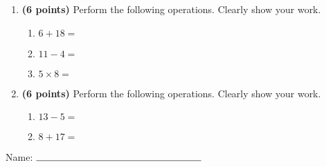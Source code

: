 \documentclass[12pt]{amsart}
\begin{document}
\newpage
\begin{enumerate}
\item {\bf (6 points)} 
 Perform the following operations. Clearly show your work. \begin{enumerate}


\def \a{6}\def \b{18}\def \apb{24}

 
\item $\a + \b = $

\vspace{2cm}
\def \a{11}\def \dif{7}\def \b{4}

 
\item $\a - \b = $

\vspace{2cm}
\def \a{5}\def \b{8}\def \ab{13}

 
\item $\a \times \b = $ 

\vspace{2cm}
\def \vshift{-1}\def \hshift{4}\def \chang{2}\def \findval{6}\def \yval{-5}

 
\end{enumerate}


\newpage
\item {\bf (6 points)} 
 Perform the following operations. Clearly show your work. \begin{enumerate}


\def \a{13}\def \dif{8}\def \b{5}

 
\item $\a - \b = $

\vspace{2cm}
\def \a{8}\def \b{17}\def \apb{25}

 
\item $\a + \b = $

\vspace{2cm}
\def \vshift{-5}\def \hshift{2}\def \chang{2}\def \findval{4}\def \yval{-9}

 
\end{enumerate}


\newpage\end{enumerate}\graphicspath{{C:/Users/iainc/anaconda3/Randomizer/Sample Course/Sample Assessment 2/}}\setcounter{page}{1}


\thispagestyle{fancy}

 
\noindent Name: $\rule{6cm}{0.15mm}$

\vspace{.2cm}
\end{document}

